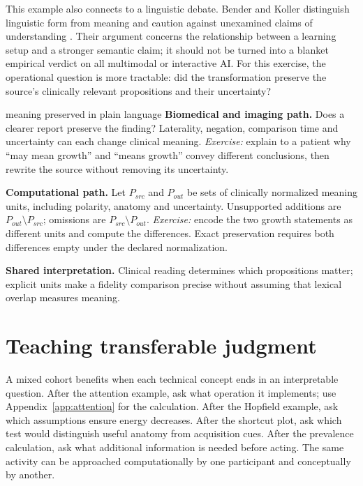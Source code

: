 \documentclass[11pt,a4paper]{article}
\begin{document}
This example also connects to a linguistic debate. Bender and Koller distinguish linguistic form from meaning and caution against unexamined claims of understanding \citep{bender2020}. Their argument concerns the relationship between a learning setup and a stronger semantic claim; it should not be turned into a blanket empirical verdict on all multimodal or interactive AI. For this exercise, the operational question is more tractable: did the transformation preserve the source's clinically relevant propositions and their uncertainty?

\begin{perspectives}{meaning preserved in plain language}
\textbf{Biomedical and imaging path.} Does a clearer report preserve the finding? Laterality, negation, comparison time and uncertainty can each change clinical meaning. \emph{Exercise:} explain to a patient why ``may mean growth'' and ``means growth'' convey different conclusions, then rewrite the source without removing its uncertainty.

\textbf{Computational path.} Let $P_{src}$ and $P_{out}$ be sets of clinically normalized meaning units, including polarity, anatomy and uncertainty. Unsupported additions are $P_{out}\setminus P_{src}$; omissions are $P_{src}\setminus P_{out}$. \emph{Exercise:} encode the two growth statements as different units and compute the differences. Exact preservation requires both differences empty under the declared normalization.

\textbf{Shared interpretation.} Clinical reading determines which propositions matter; explicit units make a fidelity comparison precise without assuming that lexical overlap measures meaning.
\end{perspectives}


\section{Teaching transferable judgment}\label{sec:teaching}
A mixed cohort benefits when each technical concept ends in an interpretable question. After the attention example, ask what operation it implements; use Appendix~\ref{app:attention} for the calculation. After the Hopfield example, ask which assumptions ensure energy decreases. After the shortcut plot, ask which test would distinguish useful anatomy from acquisition cues. After the prevalence calculation, ask what additional information is needed before acting. The same activity can be approached computationally by one participant and conceptually by another.
\end{document}
